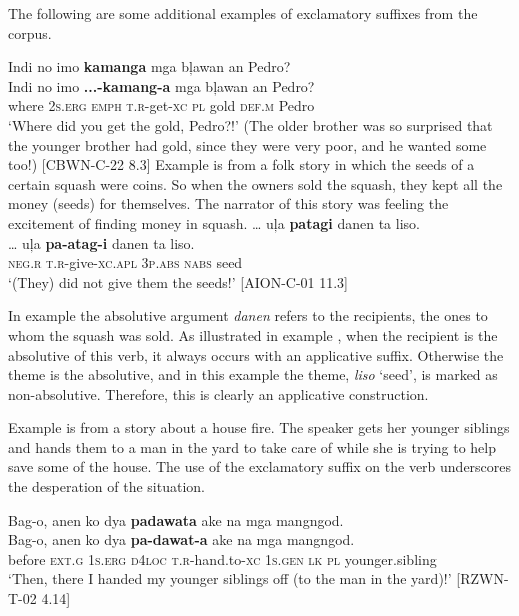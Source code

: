 The following are some additional examples of exclamatory suffixes from the corpus.

\ea
\label{bkm:Ref395799694}
Indi  no  imo  \textbf{kamanga}  mga  bļawan  an  Pedro? \\\smallskip
\gll Indi  no  imo  \textbf{...-kamang-a}  mga  bļawan  an  Pedro? \\
where  2\textsc{s.erg}  \textsc{emph} \textsc{t.r}-get-\textsc{xc}    \textsc{pl}  gold  \textsc{def.m}  Pedro \\
\glt ‘Where did you get the gold, Pedro?!’ (The older brother was so surprised that the younger brother had gold, since they were very poor, and he wanted some too!) [CBWN-C-22 8.3]
\z
Example  is from a folk story in which the seeds of a certain squash were coins. So when the owners sold the squash, they kept all the money (seeds) for themselves. The narrator of this story was feeling the excitement of finding money in squash.
\ea
\label{ex:seeds}
… uļa  \textbf{patagi}  danen  ta  liso. \\\smallskip
\gll … uļa  \textbf{pa-atag-i}  danen  ta  liso. \\
\textsc{neg.r}  \textsc{t.r}-give-\textsc{xc.apl} 3\textsc{p.abs}  \textsc{nabs}  seed \\
\glt ‘(They) did not give them the seeds!’ [AION-C-01 11.3]
\z

In example  the absolutive argument \textit{danen} refers to  the recipients, the ones to whom the squash was sold. As illustrated in example , when the recipient is the absolutive of this verb, it always occurs with an applicative suffix. Otherwise the theme is the absolutive, and in this example the theme, \textit{liso} ‘seed’, is marked as non-absolutive. Therefore, this is clearly an applicative construction.

Example  is from a story about a house fire. The speaker gets her younger siblings and hands them to a man in the yard to take care of while she is trying to help save some of the house. The use of the exclamatory suffix on the verb underscores the desperation of the situation. 

\ea
\label{bkm:Ref123024886}
Bag-o,  anen  ko  dya  \textbf{padawata}  ake  na  mga  mangngod. \\\smallskip
\gll Bag-o,  anen  ko  dya  \textbf{pa-dawat-a}  ake  na  mga  mangngod. \\
before  \textsc{ext.g} 1\textsc{s.erg}  \textsc{d}4\textsc{loc}  \textsc{t.r}-hand.to-\textsc{xc}  1\textsc{s.gen}  \textsc{lk}  \textsc{pl} younger.sibling \\
\glt ‘Then, there I handed my younger siblings off (to the man in the yard)!’ [RZWN-T-02 4.14]
\z

